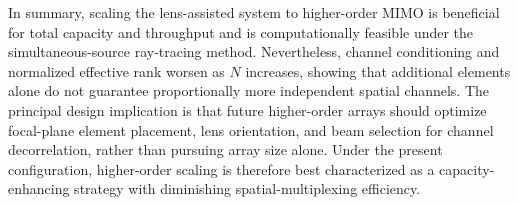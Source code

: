 In summary, scaling the lens-assisted system to higher-order MIMO is beneficial for total capacity and throughput and is computationally feasible under the simultaneous-source ray-tracing method. Nevertheless, channel conditioning and normalized effective rank worsen as $N$ increases, showing that additional elements alone do not guarantee proportionally more independent spatial channels. The principal design implication is that future higher-order arrays should optimize focal-plane element placement, lens orientation, and beam selection for channel decorrelation, rather than pursuing array size alone. Under the present configuration, higher-order scaling is therefore best characterized as a capacity-enhancing strategy with diminishing spatial-multiplexing efficiency.
